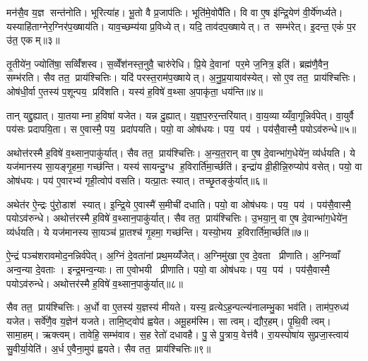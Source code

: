 मन॑सै॒व य॒ज्ञ सन्त॑नोति। भूरित्या॑ह। भू॒तो वै प्र॒जाप॑तिः। भूति॑मे॒वोपै॑ति। वि वा ए॒ष इ॑न्द्रि॒येण॑ वी॒र्ये॑णर्ध्यते। यस्याहि॑ताग्नेर॒ग्निर॑प॒ख्षाय॑ति। याव॒च्छम्य॑या प्र॒विध्येत्। यदि॒ ताव॑दप॒ख्षायेत्। त सम्भ॑रेत्। इ॒दन्त॒ एकं॑ प॒र उ॑त॒ एकम्॥३॥

तृ॒तीये॑न॒ ज्योति॑षा॒ सव्विँ॑शस्व। स॒व्वेँश॑नस्त॒नुवै॒ चारु॑रेधि। प्रि॒ये दे॒वानां पर॒मे ज॒नित्र॒ इति॑। ब्रह्म॑णै॒वैन॒ सम्भ॑रति। सैव तत॒ प्राय॑श्चित्तिः। यदि॑ परस्त॒राम॑प॒ख्षायेत्। अ॒नु॒प्र॒यायाव॑स्येत्। सो ए॒व तत॒ प्राय॑श्चित्तिः। ओष॑धी॒र्वा ए॒तस्य॑ प॒शून्पय॒ प्रवि॑शति। यस्य॑ ह॒विषे॑ व॒थ्सा अ॒पाकृ॑ता॒ धय॑न्ति॥४॥

तान् यद्दु॒ह्यात्। या॒तयाम्ना ह॒विषा॑ यजेत। यन्न दु॒ह्यात्। य॒ज्ञ॒प॒रुर॒न्तरि॑यात्। वा॒य॒व्याय्यँवा॒गून्निर्व॑पेत्। वा॒युर्वै पय॑सः प्रदापयि॒ता। स ए॒वास्मै॒ पय॒ प्रदा॑पयति। पयो॒ वा ओष॑धयः। पय॒ पय॑। पय॑सै॒वास्मै॒ पयोऽव॑रुन्धे॥५॥

अथोत्त॑रस्मै ह॒विषे॑ व॒थ्सान॒पाकु॑र्यात्। सैव तत॒ प्राय॑श्चित्तिः। अ॒न्य॒त॒रान् वा ए॒ष दे॒वान्भा॑ग॒धेये॑न॒ व्य॑र्धयति। ये यज॑मानस्य सा॒यङ्गृ॒हमा॒ गच्छ॑न्ति। यस्य॑ सायन्दु॒ग्ध ह॒विरार्ति॑मा॒र्च्छति॑। इन्द्रा॑य व्री॒हीन्नि॒रुप्योप॑ वसेत्। पयो॒ वा ओष॑धयः। पय॑ ए॒वारभ्य॑ गृही॒त्वोप॑ वसति। यत्प्रा॒तः स्यात्। तच्छृ॒तङ्कु॑र्यात्॥६॥

अथेत॑र ऐ॒न्द्रः पु॑रो॒डाश॑ स्यात्। इ॒न्द्रि॒ये ए॒वास्मै॑ स॒मीची॑ दधाति। पयो॒ वा ओष॑धयः। पय॒ पय॑। पय॑सै॒वास्मै॒ पयोऽव॑रुन्धे। अथोत्त॑रस्मै ह॒विषे॑ व॒थ्सान॒पाकु॑र्यात्। सैव तत॒ प्राय॑श्चित्तिः। उ॒भया॒न्॒ वा ए॒ष दे॒वान्भा॑ग॒धेये॑न॒ व्य॑र्धयति। ये यज॑मानस्य सा॒यञ्च॑ प्रा॒तश्च॑ गृ॒हमा॒ गच्छ॑न्ति। यस्यो॒भय ह॒विरार्ति॑मा॒र्च्छति॑॥७॥

ऐ॒न्द्रं पञ्च॑शरावमोद॒नन्निर्व॑पेत्। अ॒ग्निं दे॒वता॑नां प्रथ॒मय्यँ॑जेत्। अ॒ग्निमु॑खा ए॒व दे॒वता प्रीणाति। अ॒ग्निव्वाँ अन्व॒न्या दे॒वताः। इन्द्र॒मन्व॒न्याः। ता ए॒वोभयी प्रीणाति। पयो॒ वा ओष॑धयः। पय॒ पय॑। पय॑सै॒वास्मै॒ पयोऽव॑रुन्धे। अथोत्तर॑स्मै ह॒विषे॑ व॒थ्सान॒पाकु॑र्यात्॥८॥

सैव तत॒ प्राय॑श्चित्तिः। अ॒र्धो वा ए॒तस्य॑ य॒ज्ञस्य॑ मीयते। यस्य॒ व्रत्येऽह॒न्पत्न्य॑नालम्भु॒का भव॑ति। ताम॑प॒रुध्य॑ यजेत। सर्वे॑णै॒व य॒ज्ञेन॑ यजते। तामि॒ष्ट्वोप॑ ह्वयेत। अमू॒हम॑स्मि। सा त्वम्। द्यौर॒हम्। पृ॒थि॒वी त्वम्। सामा॒हम्। ऋक्त्वम्। तावेहि॒ सम्भ॑वाव। स॒ह रेतो॑ दधावहै। पु॒से पु॒त्राय॒ वेत्त॑वै। रा॒यस्पोषा॑य सुप्रजा॒स्त्वाय॑ सु॒वीर्या॒येति॑। अ॒र्ध ए॒वैना॒मुप॑ ह्वयते। सैव तत॒ प्राय॑श्चित्तिः॥९॥\anuvakamend[द॒धा॒ति॒ य॒ज्ञ उ॑त॒ एक॒न्धय॑न्ति रुन्धे कुर्यादा॒र्च्छत्य॒पाकु॑र्यात्पृथि॒वी त्वम॒ष्टौ च॑ (सर्वा॒न्॒ वि वै यदि॑ परस्त॒रामोष॑धीरन्यत॒रानु॒भया॑न॒र्धो वै ॥ )]


